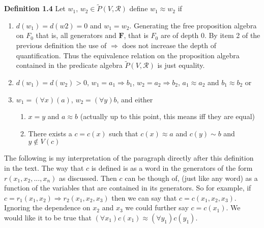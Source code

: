 \documentclass{article}
\theoremstyle{problemstyle}
\begin{document}
\begin{flushleft}
\textbf{Definition 1.4} Let $w_1$, $w_2 \in \widetilde{P}(V,\mathscr{R})$ define $w_1 \approx w_2$ if

\begin{enumerate}
\item $d(w_1) = d(w2) = 0$ and $w_1 = w_2$. Generating the free proposition algebra on $F_0$ that is, all generators and $\textbf{F}$, that is $F_0$ are of depth 0. By item 2 of the previous definition the use of $\Rightarrow$ does not increase the depth of quantification. Thus the equivalence relation on the proposition algebra contained in the predicate algebra $\widetilde{P}(V,\mathscr{R})$ is just equality. 
\item $d(w_1) = d(w_2) > 0$, $w_1 = a_1 \Rightarrow b_1$, $w_2 = a_2 \Rightarrow b_2$, $a_1 \approx a_2$ and $b_1 \approx b_2$ or 
\item $w_1 = (\forall x)(a)$, $w_2 = (\forall y)b$, and either
\begin{enumerate}
\item $x = y$ and $a \approx b$   (actually up to this point, this means iff they are equal)
\item There exists a $c = c(x)$ such that $c(x) \approx a$ and $c(y) \sim b$ and $y \notin V(c)$ 
\end{enumerate}
\end{enumerate}

The following is my interpretation of the paragraph directly after this definition in the text. The way that $c$ is defined is as a word in the generators of the form $r(x_1,x_2,...,x_n)$ as discussed. Then $c$ can be though of, (just like any word) as a function of the variables that are contained in its generators. So for example, if $c = r_1(x_1,x_2)\Rightarrow r_2(x_1,x_2,x_3)$ then we can say that $c = c(x_1,x_2,x_3)$. Ignoring the dependence on $x_2$ and $x_3$ we could further say $c = c(x_1)$. We would like it to be true that $(\forall x_1)c(x_1) \approx (\forall y_1)c(y_1)$. 
\end{flushleft}
\end{document}

